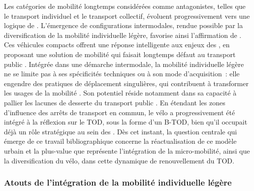 \begin{refsegment}
Les catégories de mobilité longtemps considérées comme antagonistes, telles que le transport individuel et le transport collectif, évoluent progressivement vers une logique de . L’émergence de configurations intermodales, rendue possible par la diversification de la mobilité individuelle légère, favorise ainsi l’affirmation de  \textcolor{blue}{\autocites[14-15]{amar_homo_2016}[18]{fijalkow_sociologie_2017}[5]{kostrzewska_towards_2017}}. Ces véhicules compacts offrent une réponse intelligente aux enjeux des , en proposant une solution de mobilité  qui faisait longtemps défaut au transport public \textcolor{blue}{\autocite{dia_banning_2019}}. Intégrée dans une démarche intermodale, la mobilité individuelle légère ne se limite pas à ses spécificités techniques ou à son mode d’acquisition~: elle engendre des pratiques de déplacement singulières, qui contribuent à transformer les usages de la mobilité \textcolor{blue}{\autocite[1]{tuncer_notes_2020}}. Son potentiel réside notamment dans sa capacité à pallier les lacunes de desserte du transport public \textcolor{blue}{\autocites{gauquelin_case_2021}[3]{lee_forecasting_2021}}. En étendant les zones d’influence des arrêts de transport en commun, le vélo a progressivement été intégré à la réflexion sur le \acrshort{TOD}, sous la forme d'un \acrfull{B-TOD}, bien qu’il occupait déjà un rôle stratégique au sein des . Dès cet instant, la question centrale qui émerge de ce travail bibliographique concerne la réactualisation de ce modèle urbain et la plus-value que représente l’intégration de la micro-mobilité, ainsi que la diversification du vélo, dans cette dynamique de renouvellement du \acrshort{TOD}.%

\subsubsection*{Atouts de l'intégration de la mobilité individuelle légère
    \label{chap1:avantages-mil-tc}
    }


\end{refsegment}
